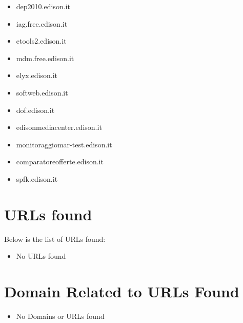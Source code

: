 \documentclass{article}
\begin{document}
\begin{itemize}
            \item dep2010.edison.it
        
            \item iag.free.edison.it
        
            \item etools2.edison.it
        
            \item mdm.free.edison.it
        
            \item elyx.edison.it
        
            \item softweb.edison.it
        
            \item dof.edison.it
        
            \item edisonmediacenter.edison.it
        
            \item monitoraggiomar-test.edison.it
        
            \item comparatoreofferte.edison.it
        
            \item spfk.edison.it
        
    
\end{itemize}

\clearpage


\section{URLs found}

Below is the list of URLs found:
\begin{itemize}
    
        \item No URLs found
    
\end{itemize}

\clearpage

\section{Domain Related to URLs Found}


\begin{itemize}
    \item No Domains or URLs found
\end{itemize}
\end{document}
